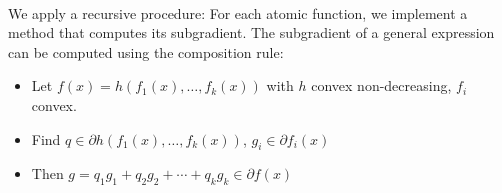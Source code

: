 \\
We apply a recursive procedure: For each atomic function, 
we implement a method that computes its subgradient. The subgradient of a
general expression can be computed using the composition rule:
\begin{itemize}

\item Let $f(x) = h(f_1(x), \ldots, f_k(x))$ with $h$ convex non-decreasing,
  $f_i$ convex.
\item Find $q \in \partial h(f_1(x), \ldots, f_k(x))$,  $g_i \in \partial
  f_i(x)$
\item Then $g = q_1 g_1 + q_2 g_2 + \cdots + q_k g_k  \in \partial f(x)$

\end{itemize}
